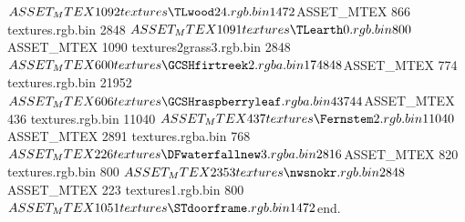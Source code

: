 $ASSET_MTEX 1092  textures\TLwood24.rgb.bin	1472
$ASSET_MTEX 866  textures\MMProcktotemple.rgb.bin	2848
$ASSET_MTEX 1091  textures\TLearth0.rgb.bin	800
$ASSET_MTEX 1090  textures\TL2grass3.rgb.bin	2848
$ASSET_MTEX 600  textures\GCSHfirtreek2.rgba.bin	174848
$ASSET_MTEX 774  textures\GCtreebarktex.rgb.bin	21952
$ASSET_MTEX 606  textures\GCSHraspberryleaf.rgba.bin	43744
$ASSET_MTEX 436  textures\Fernstem.rgb.bin	11040
$ASSET_MTEX 437  textures\Fernstem2.rgb.bin	11040
$ASSET_MTEX 2891  textures\water.rgba.bin	768
$ASSET_MTEX 226  textures\DFwaterfallnew3.rgba.bin	2816
$ASSET_MTEX 820  textures\KPicek.rgb.bin	800
$ASSET_MTEX 2353  textures\nwsnokr.rgb.bin	2848
$ASSET_MTEX 223  textures\DFrope1.rgb.bin	800
$ASSET_MTEX 1051  textures\STdoorframe.rgb.bin	1472
$end.
